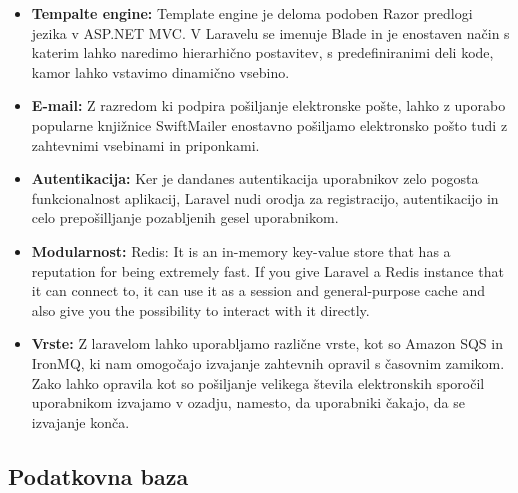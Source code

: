 \documentclass[12pt,a4paper,titlepage,openany]{report}
\begin{document}
\begin{itemize}
\item \textbf{Tempalte engine:}
Template engine je deloma podoben Razor predlogi jezika v ASP.NET MVC. V Laravelu se imenuje Blade in je enostaven način s katerim lahko naredimo hierarhično postavitev, s predefiniranimi deli kode, kamor lahko vstavimo dinamično vsebino.

\item \textbf{E-mail:}
Z razredom ki podpira pošiljanje elektronske pošte, lahko z uporabo popularne knjižnice SwiftMailer enostavno pošiljamo elektronsko pošto tudi z zahtevnimi vsebinami in priponkami.

\item \textbf{Autentikacija:}
Ker je dandanes autentikacija uporabnikov zelo pogosta funkcionalnost aplikacij, Laravel nudi orodja za registracijo, autentikacijo in celo prepošilljanje pozabljenih gesel uporabnikom.

\item \textbf{Modularnost:}
Redis: It is an in-memory key-value store that has a reputation for being extremely fast. If you give Laravel a Redis instance that it can connect to, it can use it as a session and general-purpose cache and also give you the possibility to interact with it directly.

\item \textbf{Vrste:}
Z laravelom lahko uporabljamo različne vrste, kot so Amazon SQS in IronMQ, ki nam omogočajo izvajanje zahtevnih opravil s časovnim zamikom. Zako lahko opravila kot so pošiljanje velikega števila elektronskih sporočil uporabnikom izvajamo v ozadju, namesto, da uporabniki čakajo, da se izvajanje konča.
\end{itemize}

\subsection{Podatkovna baza}
\end{document}
